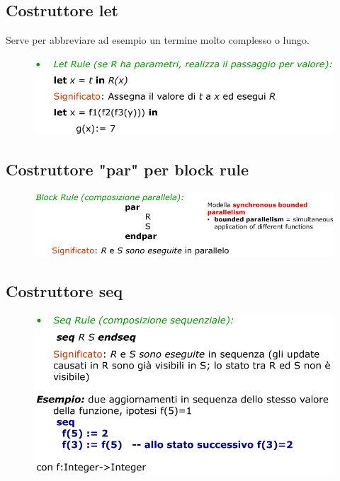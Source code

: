 \subsection{Costruttore let}
Serve per abbreviare ad esempio un termine molto complesso o lungo. 

\begin{figure}[H]
    \includegraphics[width=0.8\linewidth]{chapters/1-asm/images/let.png}
\end{figure}

\subsection{Costruttore "par" per block rule}

\begin{figure}[H]
    \includegraphics[width=0.8\linewidth]{chapters/1-asm/images/par.png}
\end{figure}

\subsection{Costruttore seq}

\begin{figure}[H]
    \includegraphics[width=0.8\linewidth]{chapters/1-asm/images/seq.png}
\end{figure}

